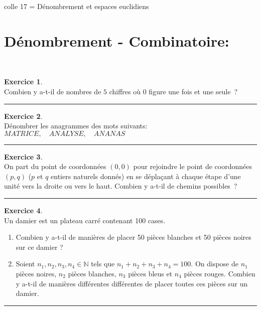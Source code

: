 \documentclass[a4paper,10pt]{article}
\theoremstyle{definition}
\theoremstyle{definition}
\newtheorem{exo}{Exercice}
\newcommand{\N}{\mathbb{N}}
\begin{document}
	
	
	\begin{center}
		\Large \sc colle 17 = Dénombrement et espaces euclidiens 
	\end{center}


\section*{Dénombrement - Combinatoire:}\hfill\\%
\begin{minipage}{1\linewidth}
	\begin{minipage}[t]{0.48\linewidth}
		\raggedright
		
		
		
		\begin{exo}\quad\\
		Combien y a-t-il de nombres de $5$ chiffres où $0$ figure une fois et une seule~?
			
			\centering
			\rule{1\linewidth}{0.6pt}
		\end{exo}
	
	\begin{exo}\quad\\
		Dénombrer les anagrammes des mots suivants:\\[0.25cm]
		
		\centering
		$MATRICE , \quad ANALYSE,\quad ANANAS$
		
		\rule{1\linewidth}{0.6pt}
	\end{exo}
		
		\begin{exo} \quad\\
			On part du point de coordonnées $(0,0)$ pour rejoindre le point de coordonnées $(p,q)$ ($p$ et $q$ entiers naturels donnés) en se déplaçant à chaque étape d'une unité vers la droite ou vers le haut. Combien y a-t-il de chemins possibles~?
			
			\centering
			\rule{1\linewidth}{0.6pt}
		\end{exo}
	

		
		
	\end{minipage}	
	\hfill\vrule\hfill
	\begin{minipage}[t]{0.48\linewidth}
		\raggedright
		
		
		\begin{exo}\quad\\
			Un damier est un plateau carré contenant 100 cases.
			\begin{enumerate}
				\item Combien y a-t-il de manières de placer 50 pièces blanches et 50 pièces noires sur ce damier ? 
				\item Soient $n_1,n_2,n_3,n_4 \in\N$ tels que $n_1 + n_2 + n_3 +n_4 = 100$. On dispose de $n_1$ pièces noires, $n_2$ pièces blanches, $n_3$ pièces bleus et $n_4$ pièces rouges. Combien y a-t-il de manières différentes différentes de placer toutes ces pièces sur un damier. 
			\end{enumerate}
			\centering
			\rule{1\linewidth}{0.6pt}
		\end{exo}
	

\end{minipage}
\end{minipage}
\end{document}
